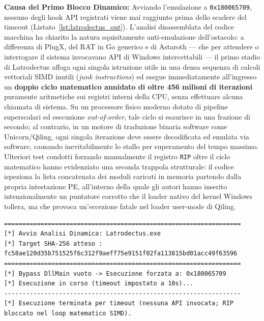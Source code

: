 \documentclass[11pt, a4paper]{article}
\begin{document}
\textbf{Causa del Primo Blocco Dinamico:} Avviando l'emulazione a \texttt{0x180065709}, nessuno degli hook API registrati viene mai raggiunto prima dello scadere del timeout (Listato~\ref{lst:latrodectus_out}). L'analisi disassemblata del codice macchina ha chiarito la natura squisitamente anti-emulazione dell'ostacolo: a differenza di PlugX, del RAT in Go generico e di Astaroth --- che per attendere o interrogare il sistema invocavano API di Windows intercettabili --- il primo stadio di Latrodectus affoga ogni singola istruzione utile in una densa sequenza di calcoli vettoriali SIMD inutili (\textit{junk instructions}) ed esegue immediatamente all'ingresso un \textbf{doppio ciclo matematico annidato di oltre 456 milioni di iterazioni} puramente aritmetiche sui registri interni della CPU, senza effettuare alcuna chiamata di sistema. Su un processore fisico moderno dotato di pipeline superscalari ed esecuzione \textit{out-of-order}, tale ciclo si esaurisce in una frazione di secondo; al contrario, in un motore di traduzione binaria software come Unicorn/Qiling, ogni singola iterazione deve essere decodificata ed emulata via software, causando inevitabilmente lo stallo per superamento del tempo massimo. Ulteriori test condotti forzando manualmente il registro \texttt{RIP} oltre il ciclo matematico hanno evidenziato una seconda trappola strutturale: il codice ispeziona la lista concatenata dei moduli caricati in memoria partendo dalla propria intestazione PE, all'interno della quale gli autori hanno inserito intenzionalmente un puntatore corrotto che il loader nativo del kernel Windows tollera, ma che provoca un'eccezione fatale nel loader user-mode di Qiling.


\noindent\begin{minipage}{\linewidth}
\begin{lstlisting}[style=consoleout, caption={Evidenza sperimentale dello stallo computazionale anti-emulazione sul primo stadio di Latrodectus.}, label={lst:latrodectus_out}]
=================================================================
[*] Avvio Analisi Dinamica: Latrodectus.exe
[*] Target SHA-256 atteso : fc58ae120d35b751525f6c312f9aeff75e9151f02fa113815bd01acc49f63596
=================================================================
[*] Bypass DllMain vuoto -> Esecuzione forzata a: 0x180065709
[*] Esecuzione in corso (timeout impostato a 10s)...
-----------------------------------------------------------------
[*] Esecuzione terminata per timeout (nessuna API invocata; RIP bloccato nel loop matematico SIMD).
\end{lstlisting}
\end{minipage}
\end{document}
